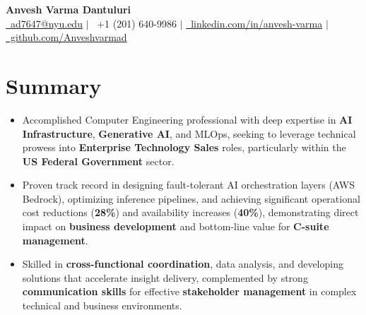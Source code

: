 \documentclass[letterpaper,10pt]{article}
\begin{document}
\begin{center}
    \vspace{-0.5em} %
    {\Huge \textbf{Anvesh Varma Dantuluri}} \\
    \vspace{0.2em}
    \small
    \href{mailto:ad7647@nyu.edu}{\faEnvelope\ ad7647@nyu.edu} \quad $|$ \quad
    \faPhone\ +1 (201) 640-9986 \quad $|$ \quad
    \href{https://linkedin.com/in/anvesh-varma}{\faLinkedin\ linkedin.com/in/anvesh-varma} \quad $|$ \quad
    \href{https://github.com/Anveshvarmad}{\faGithub\ github.com/Anveshvarmad}
    \vspace{-0.5em} %
\end{center}


\section*{Summary}
\begin{itemize}
    \item Accomplished Computer Engineering professional with deep expertise in \textbf{AI Infrastructure}, \textbf{Generative AI}, and MLOps, seeking to leverage technical prowess into \textbf{Enterprise Technology Sales} roles, particularly within the \textbf{US Federal Government} sector.
    \item Proven track record in designing fault-tolerant AI orchestration layers (AWS Bedrock), optimizing inference pipelines, and achieving significant operational cost reductions (\textbf{28\%}) and availability increases (\textbf{40\%}), demonstrating direct impact on \textbf{business development} and bottom-line value for \textbf{C-suite management}.
    \item Skilled in \textbf{cross-functional coordination}, data analysis, and developing solutions that accelerate insight delivery, complemented by strong \textbf{communication skills} for effective \textbf{stakeholder management} in complex technical and business environments.
\end{itemize}
\end{document}
